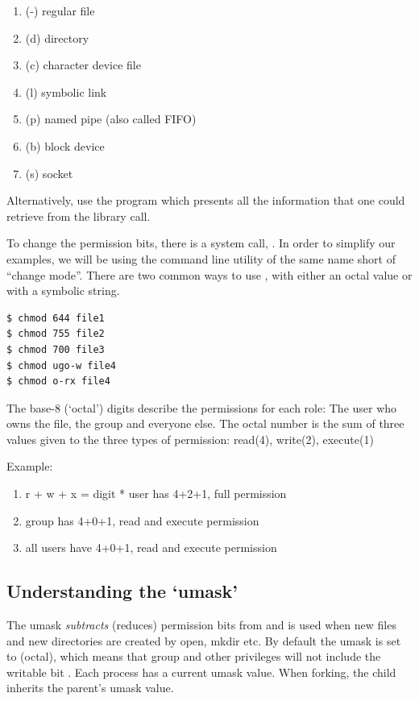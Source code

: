 \begin{enumerate}
    \item (-) regular file
    \item (d) directory
    \item (c) character device file
    \item (l) symbolic link
    \item (p) named pipe (also called FIFO)
    \item (b) block device
    \item (s) socket
\end{enumerate}

Alternatively, use the program  which presents all the information that one could retrieve from the  library call.

To change the permission bits, there is a system call, .
In order to simplify our examples, we will be using the command line utility of the same name  short of ``change mode''.
There are two common ways to use , with either an octal value or with a symbolic string.

\begin{verbatim}
$ chmod 644 file1
$ chmod 755 file2
$ chmod 700 file3
$ chmod ugo-w file4
$ chmod o-rx file4
\end{verbatim}

The base-8 (`octal') digits describe the permissions for each role: The user who owns the file, the group and everyone else.
The octal number is the sum of three values given to the three types of permission: read(4), write(2), execute(1)

Example: 

\begin{enumerate}
\item r + w + x = digit * user has 4+2+1, full permission
\item group has 4+0+1, read and execute permission
\item all users have 4+0+1, read and execute permission
\end{enumerate}

\subsection{Understanding the `umask'}

The umask \emph{subtracts} (reduces) permission bits from  and is used when new files and new directories are created by open, mkdir etc.
By default the umask is set to  (octal), which means that group and other privileges will not include the writable bit .
Each process has a current umask value.
When forking, the child inherits the parent's umask value.

